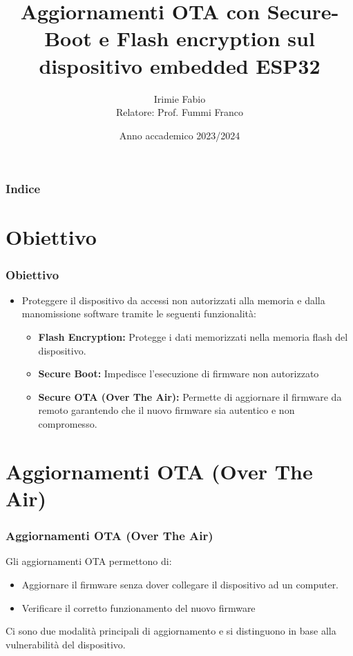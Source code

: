 \documentclass{beamer}
\title[Secure OTA su ESP32]
{Aggiornamenti OTA con Secure-Boot e Flash encryption sul dispositivo embedded ESP32}
\author[Irimie Fabio] {
  Irimie Fabio\texorpdfstring{\\}{, }
  Relatore: Prof. Fummi Franco
}
\institute[UniVr] {
  Università degli Studi di Verona\texorpdfstring{\\}{ - }
  Dipartimento di Informatica
}
\date
{Anno accademico 2023/2024}
\begin{document}
\frame{\titlepage}

\begin{frame}
\frametitle{Indice}
\tableofcontents
\end{frame}

\section{Obiettivo}
\begin{frame}
\frametitle{Obiettivo}
\begin{itemize}
  \item Proteggere il dispositivo da accessi non autorizzati alla memoria e dalla
    manomissione software tramite le seguenti funzionalità:

    \begin{itemize}
      \item \textbf{Flash Encryption:} Protegge i dati memorizzati nella memoria flash
        del dispositivo.
      \item \textbf{Secure Boot:} Impedisce l'esecuzione di firmware non autorizzato
      \item \textbf{Secure OTA (Over The Air):} Permette di aggiornare il firmware da
        remoto garantendo che il nuovo firmware sia autentico e non compromesso.
    \end{itemize}
\end{itemize}
\end{frame}

\section{Aggiornamenti OTA (Over The Air)}
\begin{frame}
\frametitle{Aggiornamenti OTA (Over The Air)} 

Gli aggiornamenti OTA permettono di:
\begin{itemize}
  \item Aggiornare il firmware senza dover collegare il dispositivo ad un computer.
  \item Verificare il corretto funzionamento del nuovo firmware
\end{itemize}

\vspace{1em}
\noindent

Ci sono due modalità principali di aggiornamento e si distinguono in base alla
vulnerabilità del dispositivo.
\end{frame}
\end{document}
